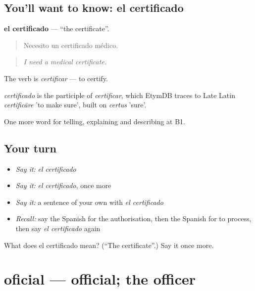 \subsection*{You'll want to know: el certificado}
\textbf{el certificado} — \textquotedblleft{}the certificate\textquotedblright{}.

\begin{quote}
Necesito un certificado médico.
\end{quote}

\begin{quote}
\emph{I need a medical certificate.}
\end{quote}

The verb is \emph{certificar} — to certify.

\begin{cousinweb}
\emph{certificado} is the participle of \emph{certificar}, which EtymDB traces to Late Latin \emph{certificāre} 'to make sure', built on \emph{certus} 'sure'.
\end{cousinweb}

\begin{grammarlens}[title={What you've built}]
One more word for telling, explaining and describing at B1.
\end{grammarlens}

\subsection*{Your turn}
\begin{itemize}
\raggedright
  \item \emph{Say it:} \emph{el certificado}
  \item \emph{Say it:} \emph{el certificado}, once more
  \item \emph{Say it:} a sentence of your own with \emph{el certificado}
  \item \emph{Recall:} say the Spanish for the authorisation, then the Spanish for to process, then say \emph{el certificado} again
\end{itemize}

\begin{tcolorbox}[breakable,colback=teal!4,colframe=teal!35!black,title={Before you move on}]
What does el certificado mean? (\textquotedblleft{}The certificate\textquotedblright{}.) Say it once more.
\end{tcolorbox}
\section[oficial]{oficial — official; the officer}

